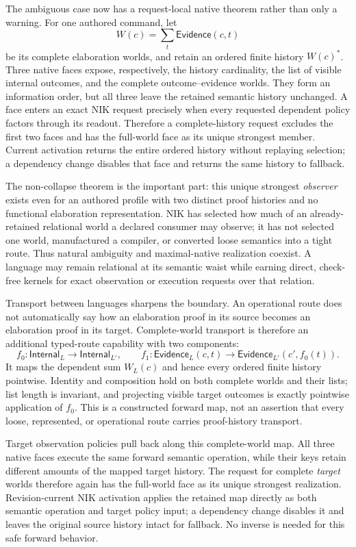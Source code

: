 \documentclass[11pt]{article}
\begin{document}
The ambiguous case now has a request-local native theorem rather than only a
warning.  For one authored command, let
\[
  W(c)=\sum_t \mathsf{Evidence}(c,t)
\]
be its complete elaboration worlds, and retain an ordered finite history
$W(c)^*$.  Three native faces expose, respectively, the history cardinality,
the list of visible internal outcomes, and the complete outcome--evidence
worlds.  They form an information order, but all three leave the retained
semantic history unchanged.  A face enters an exact NIK request precisely when
every requested dependent policy factors through its readout.  Therefore a
complete-history request excludes the first two faces and has the full-world
face as its unique strongest member.  Current activation returns the entire
ordered history without replaying selection; a dependency change disables that
face and returns the same history to fallback.

The non-collapse theorem is the important part: this unique strongest
\emph{observer} exists even for an authored profile with two distinct proof
histories and no functional elaboration representation.  NIK has selected how
much of an already-retained relational world a declared consumer may observe;
it has not selected one world, manufactured a compiler, or converted loose
semantics into a tight route.  Thus natural ambiguity and maximal-native
realization coexist.  A language may remain relational at its semantic waist
while earning direct, check-free kernels for exact observation or execution
requests over that relation.

Transport between languages sharpens the boundary.  An operational route does
not automatically say how an elaboration proof in its source becomes an
elaboration proof in its target.  Complete-world transport is therefore an
additional typed-route capability with two components:
\[
  f_0 : \mathsf{Internal}_L \longrightarrow \mathsf{Internal}_{L'},
  \qquad
  f_1 : \mathsf{Evidence}_L(c,t)
       \longrightarrow \mathsf{Evidence}_{L'}(c',f_0(t)).
\]
It maps the dependent sum $W_L(c)$ and hence every ordered finite history
pointwise.  Identity and composition hold on both complete worlds and their
lists; list length is invariant, and projecting visible target outcomes is
exactly pointwise application of $f_0$.  This is a constructed forward map,
not an assertion that every loose, represented, or operational route carries
proof-history transport.

Target observation policies pull back along this complete-world map.  All
three native faces execute the same forward semantic operation, while their
keys retain different amounts of the mapped target history.  The request for
complete \emph{target} worlds therefore again has the full-world face as its
unique strongest realization.  Revision-current NIK activation applies the
retained map directly as both semantic operation and target policy input; a
dependency change disables it and leaves the original source history intact
for fallback.  No inverse is needed for this safe forward behavior.
\end{document}

